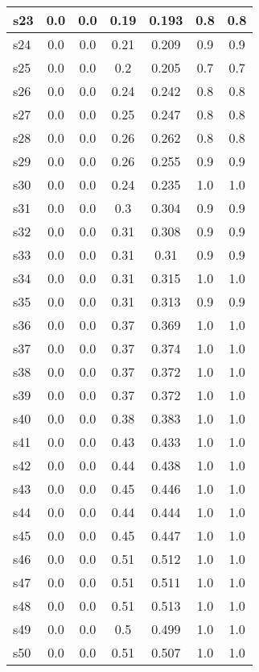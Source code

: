 \documentclass{article}
\begin{document}
\begin{tabular}{|l|c|c|c|c|c|c|}
\hline
s23 &0.0 & 0.0 & 0.19 & 0.193 & 0.8 & 0.8\\
\hline
s24 &0.0 & 0.0 & 0.21 & 0.209 & 0.9 & 0.9\\
\hline
s25 &0.0 & 0.0 & 0.2 & 0.205 & 0.7 & 0.7\\
\hline
s26 &0.0 & 0.0 & 0.24 & 0.242 & 0.8 & 0.8\\
\hline
s27 &0.0 & 0.0 & 0.25 & 0.247 & 0.8 & 0.8\\
\hline
s28 &0.0 & 0.0 & 0.26 & 0.262 & 0.8 & 0.8\\
\hline
s29 &0.0 & 0.0 & 0.26 & 0.255 & 0.9 & 0.9\\
\hline
s30 &0.0 & 0.0 & 0.24 & 0.235 & 1.0 & 1.0\\
\hline
s31 &0.0 & 0.0 & 0.3 & 0.304 & 0.9 & 0.9\\
\hline
s32 &0.0 & 0.0 & 0.31 & 0.308 & 0.9 & 0.9\\
\hline
s33 &0.0 & 0.0 & 0.31 & 0.31 & 0.9 & 0.9\\
\hline
s34 &0.0 & 0.0 & 0.31 & 0.315 & 1.0 & 1.0\\
\hline
s35 &0.0 & 0.0 & 0.31 & 0.313 & 0.9 & 0.9\\
\hline
s36 &0.0 & 0.0 & 0.37 & 0.369 & 1.0 & 1.0\\
\hline
s37 &0.0 & 0.0 & 0.37 & 0.374 & 1.0 & 1.0\\
\hline
s38 &0.0 & 0.0 & 0.37 & 0.372 & 1.0 & 1.0\\
\hline
s39 &0.0 & 0.0 & 0.37 & 0.372 & 1.0 & 1.0\\
\hline
s40 &0.0 & 0.0 & 0.38 & 0.383 & 1.0 & 1.0\\
\hline
s41 &0.0 & 0.0 & 0.43 & 0.433 & 1.0 & 1.0\\
\hline
s42 &0.0 & 0.0 & 0.44 & 0.438 & 1.0 & 1.0\\
\hline
s43 &0.0 & 0.0 & 0.45 & 0.446 & 1.0 & 1.0\\
\hline
s44 &0.0 & 0.0 & 0.44 & 0.444 & 1.0 & 1.0\\
\hline
s45 &0.0 & 0.0 & 0.45 & 0.447 & 1.0 & 1.0\\
\hline
s46 &0.0 & 0.0 & 0.51 & 0.512 & 1.0 & 1.0\\
\hline
s47 &0.0 & 0.0 & 0.51 & 0.511 & 1.0 & 1.0\\
\hline
s48 &0.0 & 0.0 & 0.51 & 0.513 & 1.0 & 1.0\\
\hline
s49 &0.0 & 0.0 & 0.5 & 0.499 & 1.0 & 1.0\\
\hline
s50 &0.0 & 0.0 & 0.51 & 0.507 & 1.0 & 1.0\\
\hline
\end{tabular}\\
\end{document}
